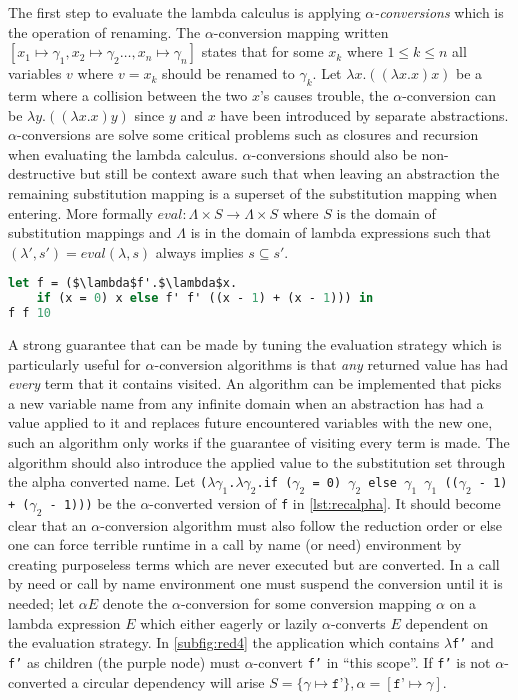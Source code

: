\documentclass[11pt,oneside,a4paper]{report}
\begin{document}
The first step to evaluate the lambda calculus is applying \textit{$\alpha$-conversions} which is the operation of renaming.
The $\alpha$-conversion mapping written $[x_1 \mapsto \gamma_1, x_2 \mapsto \gamma_2 \dots , x_n \mapsto \gamma_n]$ states that for some $x_k$ where $1 \leq k \leq n$ all variables $v$ where $v = x_k$ should be renamed to $\gamma_k$.
Let $\lambda x . ((\lambda x . x) x)$ be a term where a collision between the two $x$'s causes trouble, the $\alpha$-conversion can be $\lambda y . ((\lambda x . x) y)$ since $y$ and $x$ have been introduced by separate abstractions.
$\alpha$-conversions are solve some critical problems such as closures and recursion when evaluating the lambda calculus.
$\alpha$-conversions should also be non-destructive but still be context aware such that when leaving an abstraction the remaining substitution mapping is a superset of the substitution mapping when entering.
More formally $\textit{eval}: \Lambda \times S \rightarrow \Lambda \times S$ where $S$ is the domain of substitution mappings and $\Lambda$ is in the domain of lambda expressions such that  $(\lambda',s') = eval(\lambda, s)$ always implies $s \subseteq s'$.
\begin{lstlisting}[language=ML,caption={Recursive addition function},label={lst:recalpha},mathescape=true]
let f = ($\lambda$f'.$\lambda$x.
    if (x = 0) x else f' f' ((x - 1) + (x - 1))) in
f f 10
\end{lstlisting}
A strong guarantee that can be made by tuning the evaluation strategy which is particularly useful for $\alpha$-conversion algorithms is that \textit{any} returned value has had \textit{every} term that it contains visited.
An algorithm can be implemented that picks a new variable name from any infinite domain when an abstraction has had a value applied to it and replaces future encountered variables with the new one, such an algorithm only works if the guarantee of visiting every term is made.
The algorithm should also introduce the applied value to the substitution set through the alpha converted name.
Let \texttt{($\lambda\gamma_1$.$\lambda\gamma_2$.if ($\gamma_2$ = 0) $\gamma_2$ else $\gamma_1$ $\gamma_1$ (($\gamma_2$ - 1) + ($\gamma_2$ - 1)))} be the $\alpha$-converted version of \texttt{f} in \autoref{lst:recalpha}.
It should become clear that an $\alpha$-conversion algorithm must also follow the reduction order or else one can force terrible runtime in a call by name (or need) environment by creating purposeless terms which are never executed but are converted.
In a call by need or call by name environment one must suspend the conversion until it is needed; let $\alpha E$ denote the $\alpha$-conversion for some conversion mapping $\alpha$ on a lambda expression $E$ which either eagerly or lazily $\alpha$-converts $E$ dependent on the evaluation strategy.
In \autoref{subfig:red4} the application which contains \texttt{$\lambda$f'} and \texttt{f'} as children (the purple node) must $\alpha$-convert \texttt{f'} in ``this scope''.
If \texttt{f'} is not $\alpha$-converted a circular dependency will arise $S = \{ \gamma \mapsto \texttt{f'} \}, \alpha = [ \texttt{f'} \mapsto \gamma ]$.
\end{document}
